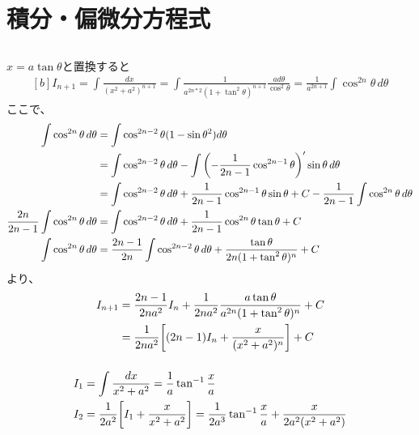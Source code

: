 \documentclass[../ap_2011.tex]{subfiles}
\begin{document}
\setcounter{chapter}{0}
\chapter{積分・偏微分方程式}
\section{}
\subsection{}
\(x=a\tan\theta\)と置換すると
\begin{equation}\begin{aligned}[b]
    I_{n+1}=\int \frac{dx}{(x^2+a^2)^{n+1}}
    = \int \frac{1}{a^{2n*2}(1+\tan^2\theta)^{n+1}}\frac{ad\theta}{\cos^2\theta}
    = \frac{1}{a^{2n+1}}\int\cos^{2n}\theta\,d\theta
\end{aligned}\end{equation}
ここで、
\begin{equation}\begin{aligned}[b]
    \int\cos^{2n}\theta\,d\theta&=\int \cos^{2n-2}\theta(1-\sin\theta^2)d\theta\\
    &=\int\cos^{2n-2}\theta\,d\theta-\int\qty(-\frac{1}{2n-1}\cos^{2n-1}\theta)'\sin\theta\,d\theta\\
    &=\int\cos^{2n-2}\theta\,d\theta+\frac{1}{2n-1}\cos^{2n-1}\theta\sin\theta +C -\frac{1}{2n-1}\int\cos^{2n}\theta\,d\theta\\
    \frac{2n}{2n-1}\int\cos^{2n}\theta\,d\theta &= \int\cos^{2n-2}\theta\,d\theta+\frac{1}{2n-1}\cos^{2n}\theta\tan\theta +C\\
    \int\cos^{2n}\theta\,d\theta &= \frac{2n-1}{2n}\int\cos^{2n-2}\theta\,d\theta+\frac{\tan\theta}{2n(1+\tan^2\theta)^n} +C
\end{aligned}\end{equation}
より、
\begin{equation}\begin{aligned}[b]
    I_{n+1}&=\frac{2n-1}{2na^2}I_n+\frac{1}{2na^2}\frac{a\tan\theta}{a^{2n}(1+\tan^2\theta)^n}+C\\
    &=\frac{1}{2na^2}\qty[(2n-1)I_n+\frac{x}{(x^2+a^2)^n}]+C
\end{aligned}\end{equation}

\subsection{}
\begin{equation}\begin{aligned}[b]
    I_1 &= \int \frac{dx}{x^2+a^2} = \frac{1}{a}\tan^{-1}\frac{x}{a}\\
    I_2 &= \frac{1}{2a^2}\qty[I_1+\frac{x}{x^2+a^2}] = \frac{1}{2a^3}\tan^{-1}\frac{x}{a}+\frac{x}{2a^2(x^2+a^2)}
\end{aligned}\end{equation}
\end{document}
